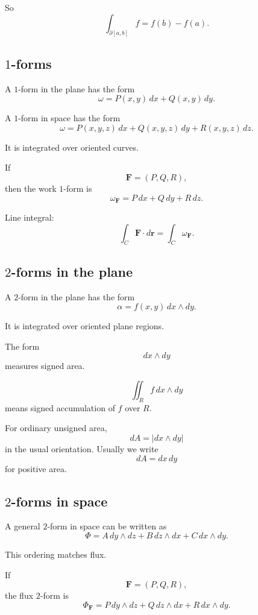 So
\[
\boxed{
    \int_{\partial[a,b]}f=f(b)-f(a).
}
\]

\subsection*{\texorpdfstring{\(1\)}{1}-forms}

A \(1\)-form in the plane has the form
\[
\boxed{
    \omega=P(x,y)\,dx+Q(x,y)\,dy.
}
\]

A \(1\)-form in space has the form
\[
\boxed{
    \omega=P(x,y,z)\,dx+Q(x,y,z)\,dy+R(x,y,z)\,dz.
}
\]

It is integrated over oriented curves.

If
\[
    \mathbf F=(P,Q,R),
\]
then the work \(1\)-form is
\[
\boxed{
    \omega_{\mathbf F}=P\,dx+Q\,dy+R\,dz.
}
\]

Line integral:
\[
\boxed{
    \int_C \mathbf F\cdot d\mathbf r
    =
    \int_C \omega_{\mathbf F}.
}
\]

\subsection*{\texorpdfstring{\(2\)}{2}-forms in the plane}

A \(2\)-form in the plane has the form
\[
\boxed{
    \alpha=f(x,y)\,dx\wedge dy.
}
\]

It is integrated over oriented plane regions.

The form
\[
\boxed{
    dx\wedge dy
}
\]
measures signed area.

\[
\boxed{
    \iint_R f\,dx\wedge dy
}
\]
means signed accumulation of \(f\) over \(R\).

For ordinary unsigned area,
\[
\boxed{
    dA=|dx\wedge dy|
}
\]
in the usual orientation.  Usually we write
\[
\boxed{
    dA=dx\,dy
}
\]
for positive area.

\subsection*{\texorpdfstring{\(2\)}{2}-forms in space}

A general \(2\)-form in space can be written as
\[
\boxed{
    \Phi
    =
    A\,dy\wedge dz
    +
    B\,dz\wedge dx
    +
    C\,dx\wedge dy.
}
\]

This ordering matches flux.

If
\[
    \mathbf F=(P,Q,R),
\]
the flux \(2\)-form is
\[
\boxed{
    \Phi_{\mathbf F}
    =
    P\,dy\wedge dz
    +
    Q\,dz\wedge dx
    +
    R\,dx\wedge dy.
}
\]

